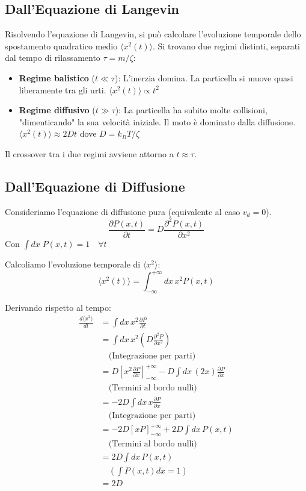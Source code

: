 \subsection{Dall'Equazione di Langevin}
Risolvendo l'equazione di Langevin, si può calcolare l'evoluzione temporale dello spostamento quadratico medio $\langle x^2(t) \rangle$.
Si trovano due regimi distinti, separati dal tempo di rilassamento $\tau = m/\zeta$:
\begin{itemize}
    \item \textbf{Regime balistico} ($t \ll \tau$): L'inerzia domina. La particella si muove quasi liberamente tra gli urti. $\langle x^2(t) \rangle \propto t^2$
    \item \textbf{Regime diffusivo} ($t \gg \tau$): La particella ha subito molte collisioni, "dimenticando" la sua velocità iniziale. Il moto è dominato dalla diffusione. $\langle x^2(t) \rangle \approx 2Dt$ dove $D = k_B T / \zeta$
\end{itemize}
Il crossover tra i due regimi avviene attorno a $t \approx \tau$.

\subsection{Dall'Equazione di Diffusione}
Consideriamo l'equazione di diffusione pura (equivalente al caso $v_d=0$).
\begin{equation}
\frac{\partial P(x,t)}{\partial t} = D\frac{\partial^2 P(x,t)}{\partial x^2}
\end{equation}
Con $\int dx\; P(x,t) = 1 \quad \forall t$

Calcoliamo l'evoluzione temporale di $\langle x^2 \rangle$:
\begin{equation}
\langle x^2(t) \rangle = \int_{-\infty}^{+\infty} dx \, x^2 P(x,t)
\end{equation}

Derivando rispetto al tempo:
\begin{equation}
\begin{aligned}
\frac{d \langle x^2 \rangle}{dt} &= \int dx \, x^2 \frac{\partial P}{\partial t} \\
&= \int dx \, x^2 \left( D \frac{\partial^2 P}{\partial x^2} \right) \\
&\quad \text{(Integrazione per parti)} \\
&= D \left[ x^2 \frac{\partial P}{\partial x} \right]_{-\infty}^{+\infty} - D \int dx \, (2x) \frac{\partial P}{\partial x} \\ 
&\quad \text{(Termini al bordo nulli)} \\
&= -2D \int dx \, x \frac{\partial P}{\partial x} \\ 
&\quad \text{(Integrazione per parti)} \\
&= -2D \left[ x P \right]_{-\infty}^{+\infty} + 2D \int dx \, P(x,t)\\ 
&\quad \text{(Termini al bordo nulli)} \\
&= 2D \int dx \, P(x,t) \\ 
&\quad \left( \int P(x,t) dx = 1 \right) \\
&= 2D
\end{aligned}
\end{equation}


